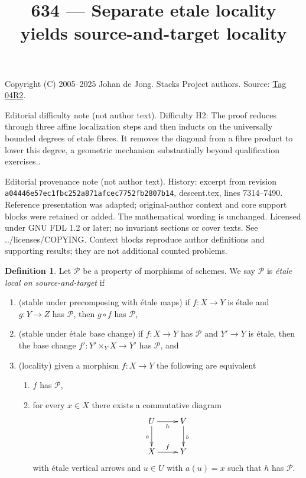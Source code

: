 \documentclass{amsart}
\theoremstyle{plain}
\theoremstyle{definition}
\newtheorem{definition}[subsection]{Definition}
\theoremstyle{remark}
\numberwithin{equation}{subsection}
\begin{document}
\title[Stacks Project, Tag 04R2]{634 --- Separate etale locality yields source-and-target locality}
\maketitle
\noindent Copyright (C) 2005--2025 Johan de Jong. Stacks Project authors. Source: \href{https://stacks.math.columbia.edu/tag/04R2}{Tag 04R2}.

\noindent Editorial difficulty note (not author text). Difficulty H2: The proof reduces through three affine localization steps and then inducts on the universally bounded degrees of etale fibres. It removes the diagonal from a fibre product to lower this degree, a geometric mechanism substantially beyond qualification exercises..

\noindent Editorial provenance note (not author text). History: excerpt from revision \texttt{a0444\allowbreak 6e57e\allowbreak c1fbc\allowbreak 252a8\allowbreak 71afc\allowbreak ec775\allowbreak 2fb28\allowbreak 07b14}, descent.tex, lines 7314--7490. Reference presentation was adapted; original-author context and core support blocks were retained or added. The mathematical wording is unchanged. Licensed under GNU FDL 1.2 or later; no invariant sections or cover texts. See ../licenses/COPYING. Context blocks reproduce author definitions and supporting results; they are not additional counted problems.

\begin{definition}
\label{definition-local-source-target}
Let $\mathcal{P}$ be a property of morphisms of schemes.
We say $\mathcal{P}$ is {\it \'etale local on source-and-target} if
\begin{enumerate}
\item (stable under precomposing with \'etale maps)
if $f : X \to Y$ is \'etale and $g : Y \to Z$ has $\mathcal{P}$,
then $g \circ f$ has $\mathcal{P}$,
\item (stable under \'etale base change)
if $f : X \to Y$ has $\mathcal{P}$ and $Y' \to Y$ is \'etale, then
the base change $f' : Y' \times_Y X \to Y'$ has $\mathcal{P}$, and
\item (locality) given a morphism $f : X \to Y$ the following are equivalent
\begin{enumerate}
\item $f$ has $\mathcal{P}$,
\item for every $x \in X$ there exists a commutative diagram
$$
\xymatrix{
U \ar[d]_a \ar[r]_h & V \ar[d]^b \\
X \ar[r]^f & Y
}
$$
with \'etale vertical arrows and $u \in U$ with $a(u) = x$ such that
$h$ has $\mathcal{P}$.
\end{enumerate}
\end{enumerate}
\end{definition}
\end{document}
